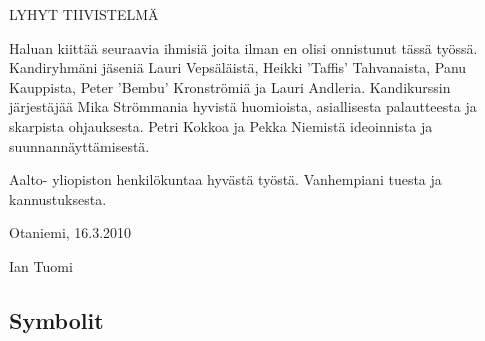 \documentclass[finnish,12pt]{article}
\begin{document}

	\author{Ian Tuomi}
	\date{5.12.2012}
	\makecoverpage

	\begin{abstractpage}[finnish]
  
LYHYT TIIVISTELMÄ
  
	\end{abstractpage}

	\newpage


Haluan kiittää seuraavia ihmisiä joita ilman en olisi onnistunut tässä työssä.
Kandiryhmäni jäseniä Lauri Vepsäläistä, Heikki 'Taffis' Tahvanaista, Panu Kauppista, Peter 'Bembu'  Kronströmiä ja Lauri Andleria.
Kandikurssin järjestäjää 
Mika Strömmania hyvistä huomioista,  asiallisesta palautteesta ja skarpista ohjauksesta.
Petri Kokkoa ja Pekka Niemistä ideoinnista ja suunnannäyttämisestä.


Aalto- yliopiston henkilökuntaa hyvästä työstä.
Vanhempiani tuesta ja kannustuksesta.
\\

	\vspace{5cm}

Otaniemi, 16.3.2010

	\vspace{5mm}
	{\hfill Ian Tuomi \hspace{1cm}}

	\newpage

	\tableofcontents


	\subsection*{Symbolit}
\end{document}
